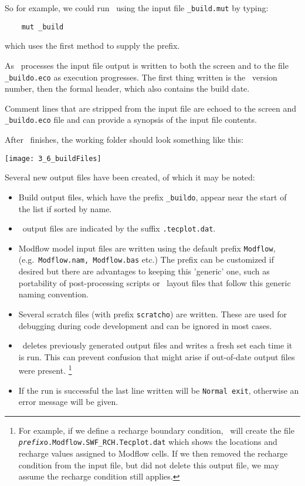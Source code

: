 So for example, we could  run \mut\ using the input file \texttt{\_build.mut} by typing:
\begin{verbatim}
    mut _build
\end{verbatim}
which uses the first method to supply the prefix.

As \mut\ processes the input file output is written to both the screen and to the file \verb+_buildo.eco+ as execution progresses.  The first thing written is the \mut\ version number, then the formal header, which also contains the build date.   

Comment lines that are stripped from the input file are echoed to the screen and \verb+_buildo.eco+ file and can provide a synopsis of the input file contents.

After \mut\ finishes, the working folder should look something like this:

        \texttt{[image: 3\_6\_buildFiles]}

Several new output files have been created, of which it may be noted:
\begin{itemize}
    \item Build output files, which have the prefix \texttt{\_buildo}, appear near the start of the list if sorted by name.
    \item \tecplot\ output files are indicated by the suffix \texttt{.tecplot.dat}.
    \item Modflow model input files are written using the default prefix \texttt{Modflow}, (e.g.\ \texttt{Modflow.nam, Modflow.bas} etc.)  The prefix can be customized if desired but there are advantages to keeping this 'generic' one, such as portability of post-processing scripts or \tecplot\ layout files that follow this generic naming convention.
    \item Several scratch files (with prefix \texttt{scratcho}) are written. These are used for debugging during code development and can be ignored in most cases.
    \item \mut\ deletes previously generated output files and writes a fresh set each time it is run.  This can prevent confusion that might arise if out-of-date output files were present.
        \footnote{For example, if we define a recharge boundary condition, \mut\ will create the file \texttt{\textit{prefix}o.Modflow.SWF\_RCH.Tecplot.dat} which shows the locations and recharge values assigned to Modflow cells.  If we then removed the recharge condition from the input file, but did not delete this output file, we may assume the recharge condition still applies.}
    \item If the run is successful the last line written will be \texttt{Normal exit}, otherwise an error message will be given.
\end{itemize}


